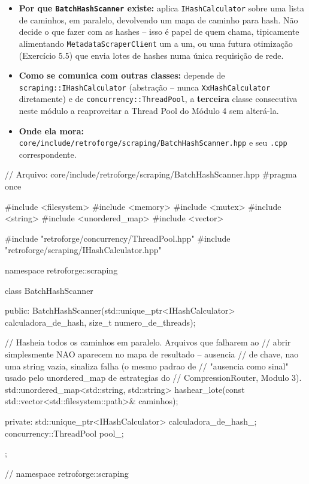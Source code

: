 \begin{itemize}
    \item \textbf{Por que \texttt{BatchHashScanner} existe:} aplica \texttt{IHashCalculator} sobre uma lista de caminhos, em paralelo, devolvendo um mapa de caminho para hash. Não decide o que fazer com as hashes -- isso é papel de quem chama, tipicamente alimentando \texttt{MetadataScraperClient} um a um, ou uma futura otimização (Exercício 5.5) que envia lotes de hashes numa única requisição de rede.
    \item \textbf{Como se comunica com outras classes:} depende de \texttt{scraping::IHashCalculator} (abstração -- nunca \texttt{XxHashCalculator} diretamente) e de \texttt{concurrency::ThreadPool}, a \textbf{terceira} classe consecutiva neste módulo a reaproveitar a Thread Pool do Módulo 4 sem alterá-la.
    \item \textbf{Onde ela mora:} \texttt{core/include/retroforge/scraping/BatchHashScanner.hpp} e seu \texttt{.cpp} correspondente.
\end{itemize}

\begin{CaixaCodigo}
// Arquivo: core/include/retroforge/scraping/BatchHashScanner.hpp
#pragma once

#include <filesystem>
#include <memory>
#include <mutex>
#include <string>
#include <unordered_map>
#include <vector>

#include "retroforge/concurrency/ThreadPool.hpp"
#include "retroforge/scraping/IHashCalculator.hpp"

namespace retroforge::scraping {

class BatchHashScanner {
public:
    BatchHashScanner(std::unique_ptr<IHashCalculator> calculadora_de_hash,
                      size_t numero_de_threads);

    // Hasheia todos os caminhos em paralelo. Arquivos que falharem ao
    // abrir simplesmente NAO aparecem no mapa de resultado -- ausencia
    // de chave, nao uma string vazia, sinaliza falha (o mesmo padrao de
    // "ausencia como sinal" usado pelo unordered_map de estrategias do
    // CompressionRouter, Modulo 3).
    std::unordered_map<std::string, std::string>
    hashear_lote(const std::vector<std::filesystem::path>& caminhos);

private:
    std::unique_ptr<IHashCalculator> calculadora_de_hash_;
    concurrency::ThreadPool pool_;
};

} // namespace retroforge::scraping
\end{CaixaCodigo}

